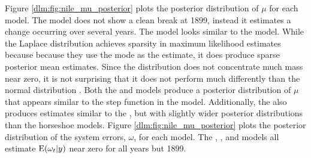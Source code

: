 Figure \ref{dlm:fig:nile_mu_posterior} plots the posterior distribution of $\mu$ for each model.
The  model does not show a clean break at 1899, instead it estimates a change occurring over several years. 
The  model looks similar to the  model. 
While the Laplace distribution achieves sparsity in maximum likelihood estimates because because they use the mode as the estimate, it does produce sparse posterior mean estimates.
Since the distribution does not concentrate much mass near zero, it is not surprising that it does not perform much differently than the normal distribution \parencites{ParkCasella2008}.
Both the  and  models produce a posterior distribution of $\mu$ that appears similar to the step function in the  model.
Additionally, the  also produces estimates similar to the , but with slightly wider posterior distributions than the horseshoe models.
Figure \ref{dlm:fig:nile_mu_posterior} plots the posterior distribution of the system errors, $\omega$, for each model.
The , , and  models all estimate $\operatorname{E}(\omega_{t} | y)$ near zero for all years but 1899.

